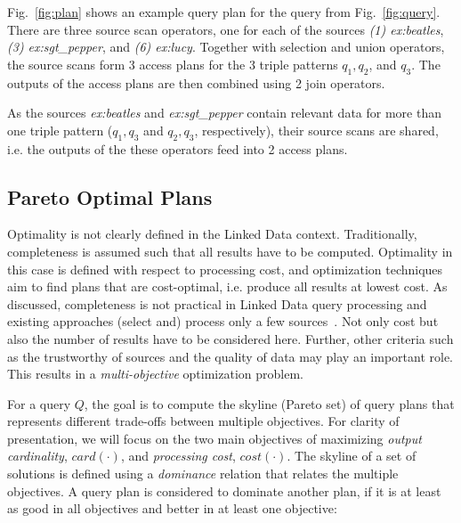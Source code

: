 \begin{example}
  Fig.~\ref{fig:plan} shows an example query plan for the 
  query from Fig.~\ref{fig:query}. There are three source scan
  operators, one for each of the sources \emph{(1) ex:beatles},
  \emph{(3) ex:sgt\_pepper}, and \emph{(6) ex:lucy}. Together with 
  selection and union operators, the source scans form 3 access
  plans for the 3 triple patterns $q_1, q_2$, and $q_3$.  The
  outputs of the access plans are then combined using 2 join operators.

  As the sources \emph{ex:beatles} and \emph{ex:sgt\_pepper} contain
  relevant data for more than one triple pattern ($q_1,q_3$ and
  $q_2,q_3$, respectively), their source scans are shared, i.e. the
  outputs of the these operators feed into 2 access plans.
\end{example}


\subsection{Pareto Optimal Plans} 
Optimality is not clearly defined in the Linked Data context. Traditionally, completeness is assumed such that all results have to be computed. Optimality in this case is defined with respect to processing cost, and optimization techniques aim to find plans that are cost-optimal, i.e. produce all results at lowest cost. As discussed, completeness is not practical in Linked Data query processing and existing approaches (select and) process only a few sources~\cite{harth_data_2010,ladwig_linked_2010}. Not only cost but also the number of results have to be considered here. Further, other criteria such as the trustworthy of sources and the quality of data may play an important role. This results in a \emph{multi-objective} optimization problem. 

For a query $Q$, %
the goal is to compute the skyline (Pareto set) of query plans that represents different trade-offs between multiple objectives. For clarity of presentation, we will focus on the two main objectives of maximizing \emph{output cardinality}, $card(\cdot)$, and \emph{processing cost}, $cost(\cdot)$. 
The skyline of a set of solutions is defined using a \emph{dominance}
relation that relates the multiple objectives. A query plan is considered to dominate another plan, if it is at least as good in all objectives and better in at least one objective:

